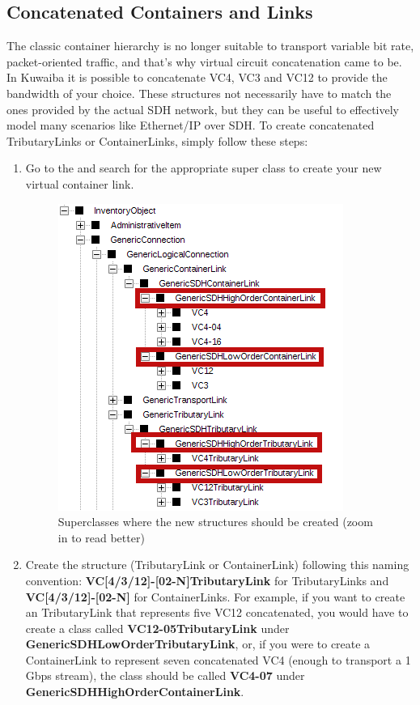 \documentclass[a4paper]{article}
\begin{document}
		\subsection{Concatenated Containers and Links}
		The classic container hierarchy is no longer suitable to transport variable bit rate, packet-oriented traffic, and that's why virtual circuit concatenation came to be. In Kuwaiba it is possible to concatenate VC4, VC3 and VC12 to provide the bandwidth of your choice. These structures not necessarily have to match the ones provided by the actual SDH network, but they can be useful to effectively model many scenarios like Ethernet/IP over SDH. To create concatenated TributaryLinks or ContainerLinks, simply follow these steps:
		\begin{enumerate}
			\item Go to the  and search for the appropriate super class to create your new virtual container link.
				\begin{figure}[h!]
					\centering
					\includegraphics[width=0.4\linewidth]{img/sdh_module_core_classes.png}
					\caption{Superclasses where the new structures should be created (zoom in to read better)}
					\label{fig:sdh_module_tributary_link_report}
				\end{figure}
				\item Create the structure (TributaryLink or ContainerLink) following this naming convention: \textbf{VC[4/3/12]-[02-N]TributaryLink} for TributaryLinks and \textbf{VC[4/3/12]-[02-N]} for ContainerLinks. For example, if you want to create an TributaryLink that represents five VC12 concatenated, you would have to create a class called \textbf{VC12-05TributaryLink} under \textbf{GenericSDHLowOrderTributaryLink}, or, if you were to create a ContainerLink to represent seven concatenated VC4 (enough to transport a 1 Gbps stream), the class should be called \textbf{VC4-07} under \textbf{GenericSDHHighOrderContainerLink}.
				 

\end{enumerate}
\end{document}
